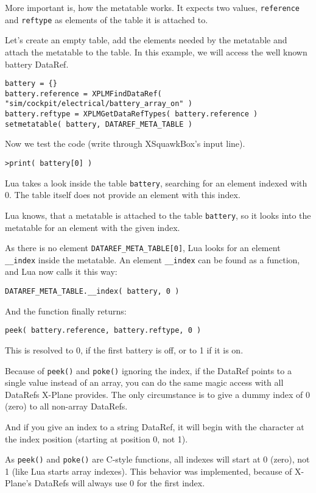 \documentclass[11pt,parskip=half,a4paper]{scrartcl}
\begin{document}
More important is, how the metatable works. It expects two values, \verb|reference| and \verb|reftype| as elements of the table it is attached to.

Let's create an empty table, add the elements needed by the metatable and attach the metatable to the table. In this example, we will access the well known battery DataRef.

\begin{lstlisting}
battery = {}
battery.reference = XPLMFindDataRef( "sim/cockpit/electrical/battery_array_on" )
battery.reftype = XPLMGetDataRefTypes( battery.reference )
setmetatable( battery, DATAREF_META_TABLE )
\end{lstlisting}

Now we test the code (write through XSquawkBox's input line).

\verb|>print( battery[0] )|

Lua takes a look inside the table \verb|battery|, searching for an element indexed with 0. The table itself does not provide an element with this index.

Lua knows, that a metatable is attached to the table \verb|battery|, so it looks into the metatable for an element with the given index.

As there is no element \verb|DATAREF_META_TABLE[0]|, Lua looks for an element \verb|__index| inside the metatable. An element \verb|__index| can be found as a function, and Lua now calls it this way:

\verb|DATAREF_META_TABLE.__index( battery, 0 )|

And the function finally returns:

\verb|peek( battery.reference, battery.reftype, 0 )|

This is resolved to 0, if the first battery is off, or to 1 if it is on.

Because of \verb|peek()| and \verb|poke()| ignoring the index, if the DataRef points to a single value instead of an array, you can do the same magic access with all DataRefs X-Plane provides. The only circumstance is to give a dummy index of 0 (zero) to all non-array DataRefs.

And if you give an index to a string DataRef, it will begin with the character at the index position (starting at position 0, not 1).

As \verb|peek()| and \verb|poke()| are C-style functions, all indexes will start at 0 (zero), not 1 (like Lua starts array indexes). This behavior was implemented, because of X-Plane's DataRefs will always use 0 for the first index.
\end{document}
